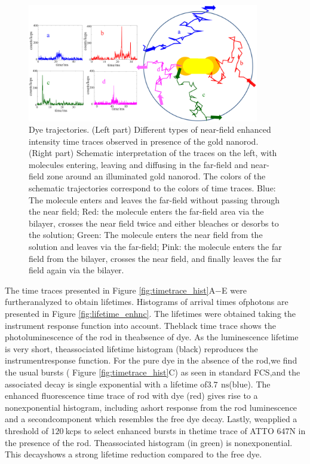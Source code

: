 \documentclass[journal=jacsat,manuscript=article]{achemso}
\newcommand{\ns}{\ensuremath{\,\textrm{ns}}}
\begin{document}
\begin{figure}
	\centering
	\includegraphics[width=0.9\textwidth]{enhnc_trajectories.png}
	\caption{Dye trajectories. (Left part) Different types of near-field enhanced intensity time traces observed in presence of the gold nanorod. (Right part) Schematic interpretation of the traces on the left, with molecules entering, leaving and diffusing in the far-field and near-field zone around an illuminated gold nanorod. The colors of the schematic trajectories correspond to the colors of time traces. Blue: The molecule enters and leaves the far-field without passing through the near field; Red: the molecule enters the far-field area via the bilayer, crosses the near field twice and either bleaches or desorbs to the solution; Green: The molecule enters the near field from the solution and leaves via the far-field; Pink: the molecule enters the far field from the bilayer, crosses the near field, and finally leaves the far field again via the bilayer.}
	\label{fig:enhnc_trajectories}
\end{figure}
The time traces presented in Figure \ref{fig:timetrace_hist}A−E were furtheranalyzed to obtain lifetimes. Histograms of arrival times ofphotons are presented in Figure \ref{fig:lifetime_enhnc}. The lifetimes were obtained taking the instrument response function into account. Theblack time trace shows the photoluminescence of the rod in theabsence of dye. As the luminescence lifetime is very short, theassociated lifetime histogram (black) reproduces the instrumentresponse function. For the pure dye in the absence of the rod,we ﬁnd the usual bursts ( Figure \ref{fig:timetrace_hist}C) as seen in standard FCS,and the associated decay is single exponential with a lifetime of$3.7~$\ns (blue). The enhanced ﬂuorescence time trace of rod with dye (red) gives rise to a nonexponential histogram, including ashort response from the rod luminescence and a secondcomponent which resembles the free dye decay. Lastly, weapplied a threshold of $120~$kcps to select enhanced bursts in thetime trace of ATTO 647N in the presence of the rod. Theassociated histogram (in green) is nonexponential. This decayshows a strong lifetime reduction compared to the free dye.\\
\end{document}
